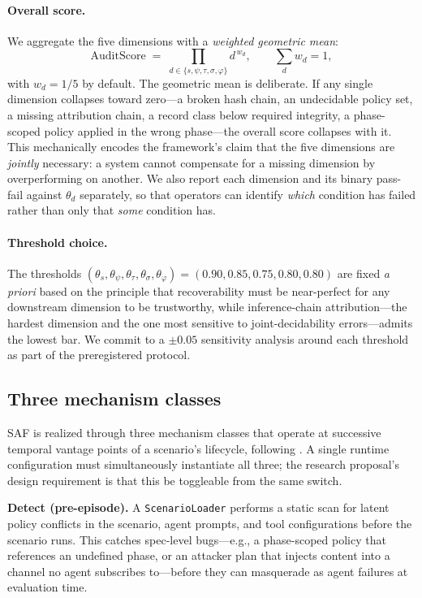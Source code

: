 \documentclass{article}
\begin{document}
\paragraph{Overall score.} We aggregate the five dimensions with a \emph{weighted geometric mean}:
\[
  \mathrm{AuditScore} \;=\; \prod_{d \in \{s, \psi, \tau, \sigma, \varphi\}} d^{\,w_d}, \qquad \sum_{d} w_d = 1,
\]
with $w_d = 1/5$ by default. The geometric mean is deliberate. If any single dimension collapses toward zero---a broken hash chain, an undecidable policy set, a missing attribution chain, a record class below required integrity, a phase-scoped policy applied in the wrong phase---the overall score collapses with it. This mechanically encodes the framework's claim that the five dimensions are \emph{jointly} necessary: a system cannot compensate for a missing dimension by overperforming on another. We also report each dimension and its binary pass-fail against $\theta_d$ separately, so that operators can identify \emph{which} condition has failed rather than only that \emph{some} condition has.

\paragraph{Threshold choice.} The thresholds $(\theta_s, \theta_\psi, \theta_\tau, \theta_\sigma, \theta_\varphi) = (0.90, 0.85, 0.75, 0.80, 0.80)$ are fixed \emph{a priori} based on the principle that recoverability must be near-perfect for any downstream dimension to be trustworthy, while inference-chain attribution---the hardest dimension and the one most sensitive to joint-decidability errors---admits the lowest bar. We commit to a $\pm 0.05$ sensitivity analysis around each threshold as part of the preregistered protocol.

\subsection{Three mechanism classes}
\label{sec:saf:mech}

SAF is realized through three mechanism classes that operate at successive temporal vantage points of a scenario's lifecycle, following \citet{nian2026auditable}. A single runtime configuration must simultaneously instantiate all three; the research proposal's design requirement is that this be toggleable from the same switch.

\textbf{Detect (pre-episode).} A \texttt{ScenarioLoader} performs a static scan for latent policy conflicts in the scenario, agent prompts, and tool configurations before the scenario runs. This catches spec-level bugs---e.g., a phase-scoped policy that references an undefined phase, or an attacker plan that injects content into a channel no agent subscribes to---before they can masquerade as agent failures at evaluation time.
\end{document}
